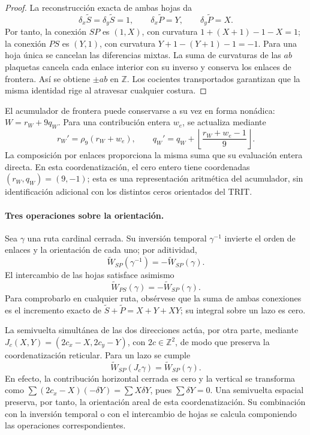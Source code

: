 \begin{proof}
La reconstrucción exacta de ambas hojas da
\[
 \delta_x\widetilde S=\delta_y\widetilde S=1,
 \qquad\delta_x\widetilde P=Y,
 \qquad\delta_y\widetilde P=X.
\]
Por tanto, la conexión $SP$ es $(1,X)$, con curvatura
$1+(X+1)-1-X=1$; la conexión $PS$ es $(Y,1)$, con curvatura
$Y+1-(Y+1)-1=-1$. Para una hoja única se cancelan las diferencias
mixtas. La suma de curvaturas de las $ab$ plaquetas cancela cada
enlace interior con su inverso y conserva los enlaces de frontera.
Así se obtiene $\pm ab$ en $\mathbb Z$. Los cocientes transportados
garantizan que la misma identidad rige al atravesar cualquier costura.
\end{proof}

El acumulador de frontera puede conservarse a su vez en forma nonádica:
$W=r_W+9q_W$. Para una contribución entera $w_e$, se actualiza mediante
\[
 r_W'=\rho_9(r_W+w_e),\qquad
 q_W'=q_W+\left\lfloor\frac{r_W+w_e-1}{9}\right\rfloor.
\]
La composición por enlaces proporciona la misma suma que su evaluación
entera directa. En esta coordenatización, el cero entero tiene coordenadas
$(r_W,q_W)=(9,-1)$; esta es una representación aritmética del acumulador,
sin identificación adicional con los distintos ceros orientados del TRIT.

\paragraph{Tres operaciones sobre la orientación.}
Sea $\gamma$ una ruta cardinal cerrada. Su inversión temporal
$\gamma^{-1}$ invierte el orden de enlaces y la orientación de cada uno;
por aditividad,
\[
 \widetilde W_{SP}(\gamma^{-1})=-\widetilde W_{SP}(\gamma).
\]
El intercambio de las hojas satisface asimismo
\[
 \widetilde W_{PS}(\gamma)=-\widetilde W_{SP}(\gamma).
\]
Para comprobarlo en cualquier ruta, obsérvese que la suma de ambas
conexiones es el incremento exacto de
$\widetilde S+\widetilde P=X+Y+XY$; su integral sobre un lazo es cero.

La semivuelta simultánea de las dos direcciones actúa, por otra parte,
mediante $J_c(X,Y)=(2c_x-X,2c_y-Y)$, con $2c\in\mathbb Z^2$,
de modo que preserva la coordenatización reticular. Para un lazo se cumple
\[
 \widetilde W_{SP}(J_c\gamma)=\widetilde W_{SP}(\gamma).
\]
En efecto, la contribución horizontal cerrada es cero y la vertical
se transforma como
$\sum (2c_x-X)(-\delta Y)=\sum X\delta Y$, pues
$\sum\delta Y=0$. Una semivuelta espacial preserva, por tanto, la
orientación areal de esta coordenatización. Su combinación con la inversión temporal
o con el intercambio de hojas se calcula componiendo las operaciones
correspondientes.

